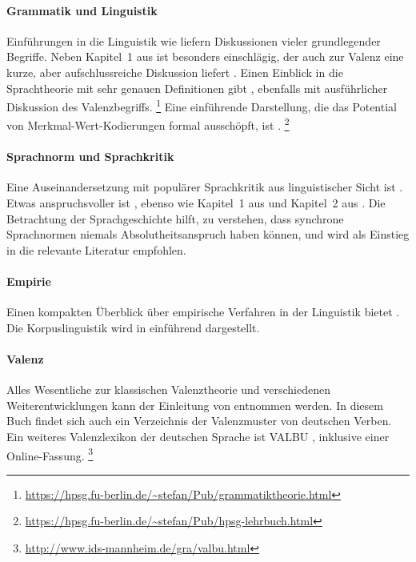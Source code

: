 \begin{sloppypar}

\paragraph*{Grammatik und Linguistik}

Einführungen in die Linguistik wie \citet{EgL07} liefern Diskussionen vieler grundlegender Begriffe.
Neben Kapitel~1 aus \citet{Eisenberg1} ist \citet{Engel09} besonders einschlägig, der auch zur Valenz eine kurze, aber aufschlussreiche Diskussion liefert \citep[70--73]{Engel09}.
Einen Einblick in die Sprachtheorie mit sehr genauen Definitionen gibt \citet{Mueller10}, ebenfalls mit ausführlicher Diskussion des Valenzbegriffs.%
\footnote{\url{https://hpsg.fu-berlin.de/~stefan/Pub/grammatiktheorie.html}}
Eine einführende Darstellung, die das Potential von Merkmal-Wert-Kodierungen formal ausschöpft, ist \citet{Mueller08}.%
\footnote{\url{https://hpsg.fu-berlin.de/~stefan/Pub/hpsg-lehrbuch.html}}

\paragraph*{Sprachnorm und Sprachkritik}

Eine Auseinandersetzung mit populärer Sprachkritik aus linguistischer Sicht ist \citet{Meinunger08}.
Etwas anspruchsvoller ist \citet{Eisenberg08}, ebenso wie Kapitel~1 aus \citet{Eisenberg1} und Kapitel~2 aus \citet{Eisenberg2}.
Die Betrachtung der Sprachgeschichte hilft, zu verstehen, dass synchrone Sprachnormen niemals Absolutheitsanspruch haben können, und \citet{NueblingEa2010} wird als Einstieg in die relevante Literatur empfohlen.

\paragraph*{Empirie}

Einen kompakten Überblick über empirische Verfahren in der Linguistik bietet \citet{Albert07}.
Die Korpuslinguistik wird in \citet{Perkuhn-ea2012} einführend dargestellt.

\paragraph*{Valenz}

Alles Wesentliche zur klassischen Valenztheorie und verschiedenen Weiterentwicklungen kann der Einleitung von \citet{HS91} entnommen werden.
In diesem Buch findet sich auch ein Verzeichnis der Valenzmuster von deutschen Verben.
Ein weiteres Valenzlexikon der deutschen Sprache ist VALBU \citep{Valbu}, inklusive einer Online-Fassung.%
\footnote{\url{http://www.ids-mannheim.de/gra/valbu.html}}

\end{sloppypar}
